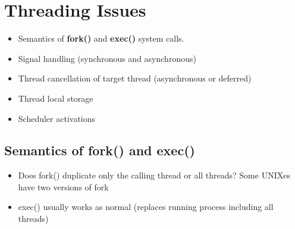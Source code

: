 \documentclass{book/custombook}
\begin{document}
        \section{Threading Issues}
            \begin{itemize}
                \item Semantics of \textbf{fork()} and \textbf{exec()} system calls.
                \item Signal handling (synchronous and asynchronous)
                \item Thread cancellation of target thread (asynchronous or deferred)
                \item Thread local storage
                \item Scheduler activations
            \end{itemize}
            \subsection{Semantics of fork() and exec()}
                \begin{itemize}
                    \item Does fork() duplicate only the calling thread or all threads?
                        \subitem Some UNIXes have two versions of fork
                    \item exec() usually works as normal (replaces running process including all threads)
                \end{itemize}
\end{document}
